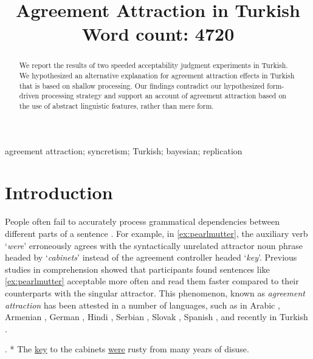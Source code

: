 \documentclass[times,linguex]{glossa}\usepackage[]{graphicx}\usepackage[]{color}
\title[Agreement Attraction in Turkish]{Agreement Attraction in Turkish\\ \bigskip \large Word count: 4720}
\author[T\"{u}rk \& Loga\v{c}ev]%
{%
  \spauthor{Utku T\"{u}rk\\ 
  \institute{Bo\u{g}azi\c{c}i University}\\
  \small{%
  utku.turk@boun.edu.tr}
  }
  \AND
  \spauthor{Pavel Loga\v{c}ev \\
  \institute{Bo\u{g}azi\c{c}i University}\\
  \small{%
  pavel.logacev@boun.edu.tr}
  }%
}
\begin{document}

\sffamily
\maketitle


\begin{abstract}
We report the results of two speeded acceptability judgment experiments in Turkish. We hypothesized an alternative explanation for agreement attraction effects in Turkish that is based on shallow processing. Our findings contradict our hypothesized form-driven processing strategy and support an account of agreement attraction based on the use of abstract linguistic features, rather than mere form.
\end{abstract}

\begin{keywords}
  agreement attraction; syncretism; Turkish; bayesian; replication
\end{keywords}

\rmfamily




\section{Introduction}

People often fail to accurately process grammatical dependencies between different parts of a sentence \citep[e.g.]{GibsonThomas:1999,PhillipsEtAl:2011}. For example, in \ref{ex:pearlmutter}, the auxiliary verb `\textit{were}' erroneously agrees with the syntactically unrelated attractor noun phrase headed by `\textit{cabinets}' instead of the agreement controller headed `\textit{key}'. Previous  studies in comprehension \citep{NicolEtAl:1997, PearlmutterGarnseyBock:1999} showed that participants found sentences like \ref{ex:pearlmutter} acceptable more often and read them faster compared to their counterparts with the singular attractor. This phenomenon, known as \textit{agreement attraction} \citep{BockMiller:1991} has been attested in a number of languages, such as in Arabic \citep{TuckerEtAl:2015}, Armenian \citep{AvetisyanEtAl:2020}, German \citep{LagoFelser:2018}, Hindi \citep{BhatiaDillon:2020}, Serbian \citep{RisticEtAl:2016}, Slovak \citep{BadeckerKuminiak:2007}, Spanish \citep{LagoEtAl:2015}, and recently in Turkish \citep{LagoEtAl:2018}.


\ex. \label{ex:pearlmutter} * The \underline{key} to the cabinets \underline{were} rusty from many years of disuse. 
\end{document}
